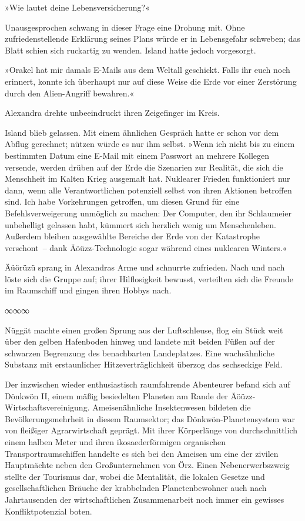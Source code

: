 »Wie lautet deine Lebensversicherung?«

Unausgesprochen schwang in dieser Frage eine Drohung mit. Ohne zufriedenstellende Erklärung seines Plans würde er in Lebensgefahr schweben; das Blatt schien sich ruckartig zu wenden. Island hatte jedoch vorgesorgt.

»Orakel hat mir damals E-Mails aus dem Weltall geschickt. Falls ihr euch noch erinnert, konnte ich überhaupt nur auf diese Weise die Erde vor einer Zerstörung durch den Alien-Angriff bewahren.«

Alexandra drehte unbeeindruckt ihren Zeigefinger im Kreis. 

Island blieb gelassen. Mit einem ähnlichen Gespräch hatte er schon vor dem Abflug gerechnet; nützen würde es nur ihm selbst. »Wenn ich nicht bis zu einem bestimmten Datum eine E-Mail mit einem Passwort an mehrere Kollegen versende, werden drüben auf der Erde die Szenarien zur Realität, die sich die Menschheit im Kalten Krieg ausgemalt hat. Nuklearer Frieden funktioniert nur dann, wenn alle Verantwortlichen potenziell selbst von ihren Aktionen betroffen sind. Ich habe Vorkehrungen getroffen, um diesen Grund für eine Befehlsverweigerung unmöglich zu machen: Der Computer, den ihr Schlaumeier unbehelligt gelassen habt, kümmert sich herzlich wenig um Menschenleben. Außerdem bleiben ausgewählte Bereiche der Erde von der Katastrophe verschont~– dank Äöüzz-Technologie sogar während eines nuklearen Winters.«

Äüörüzü sprang in Alexandras Arme und schnurrte zufrieden. Nach und nach löste sich die Gruppe auf; ihrer Hilflosigkeit bewusst, verteilten sich die Freunde im Raumschiff und gingen ihren Hobbys nach.

\begin{center}
∞∞∞
\end{center}

Nüggät machte einen großen Sprung aus der Luftschleuse, flog ein Stück weit über den gelben Hafenboden hinweg und landete mit beiden Füßen auf der schwarzen Begrenzung des benachbarten Landeplatzes. Eine wachsähnliche Substanz mit erstaunlicher Hitzeverträglichkeit überzog das sechseckige Feld.

Der inzwischen wieder enthusiastisch raumfahrende Abenteurer befand sich auf Dönkwön II, einem mäßig besiedelten Planeten am Rande der Äöüzz-Wirtschaftsvereinigung. Ameisenähnliche Insektenwesen bildeten die Bevölkerungsmehrheit in diesem Raumsektor; das Dönkwön-Planetensystem war von fleißiger Agrarwirtschaft geprägt. Mit ihrer Körperlänge von durchschnittlich einem halben Meter und ihren ikosaederförmigen organischen Transportraumschiffen handelte es sich bei den Ameisen um eine der zivilen Hauptmächte neben den Großunternehmen von Örz. Einen Nebenerwerbszweig stellte der Tourismus dar, wobei die Mentalität, die lokalen Gesetze und gesellschaftlichen Bräuche der krabbelnden Planetenbewohner auch nach Jahrtausenden der wirtschaftlichen Zusammenarbeit noch immer ein gewisses Konfliktpotenzial boten.


